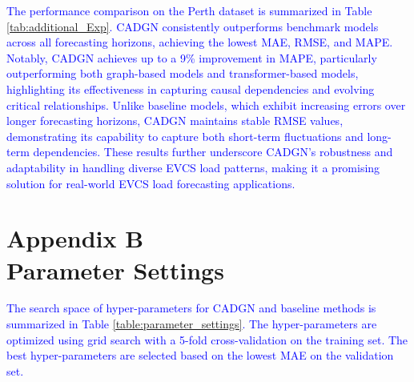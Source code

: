 \documentclass[lettersize,journal]{IEEEtran}
\newcommand{\hl}[1]{\textcolor{blue}{#1}}
\begin{document}
\hl{The performance comparison on the Perth dataset is summarized in Table \ref{tab:additional_Exp}. CADGN consistently outperforms benchmark models across all forecasting horizons, achieving the lowest MAE, RMSE, and MAPE. Notably, CADGN achieves up to a 9\% improvement in MAPE, particularly outperforming both graph-based models and transformer-based models, highlighting its effectiveness in capturing causal dependencies and evolving critical relationships. Unlike baseline models, which exhibit increasing errors over longer forecasting horizons, CADGN maintains stable RMSE values, demonstrating its capability to capture both short-term fluctuations and long-term dependencies. These results further underscore CADGN's robustness and adaptability in handling diverse EVCS load patterns, making it a promising solution for real-world EVCS load forecasting applications.}


\section*{Appendix B \\ Parameter Settings}

\label{section:appendixA}

\hl{The search space of hyper-parameters for CADGN and baseline methods is summarized in Table \ref{table:parameter_settings}. The hyper-parameters are optimized using grid search with a 5-fold cross-validation on the training set. The best hyper-parameters are selected based on the lowest MAE on the validation set.}

\end{document}
